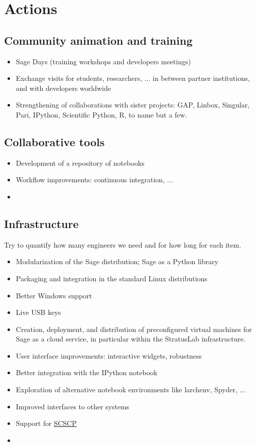 \section{Actions}

\subsection{Community animation and training}

\begin{itemize}
\item Sage Days (training workshops and developers meetings)
\item Exchange visits for students, researchers, ... in between
  partner institutions, and with developers worldwide
\item Strengthening of collaborations with sister projects: GAP,
  Linbox, Singular, Pari, IPython, Scientific Python, R, to name but a
  few.
\end{itemize}

\subsection{Collaborative tools}

\begin{itemize}
\item Development of a repository of notebooks
\item Workflow improvements: continuous integration, ...
\item {}
\end{itemize}

\subsection{Infrastructure}
Try to quantify how many engineers we need and for how long for each item.

\begin{itemize}
\item Modularization of the Sage distribution; Sage as a Python library
\item Packaging and integration in the standard Linux distributions
\item Better Windows support
\item Live USB keys
\item Creation, deployment, and distribution of preconfigured virtual
  machines for Sage as a cloud service, in particular within the
  StratusLab infrastructure.
\item User interface improvements: interactive widgets, robustness
\item Better integration with the IPython notebook
\item Exploration of alternative notebook environments like larchenv,
  Spyder, ...
\item Improved interfaces to other systems
\item Support for \href{http://www.symbolic-computing.org/}{SCSCP}
\item {}
\end{itemize}

